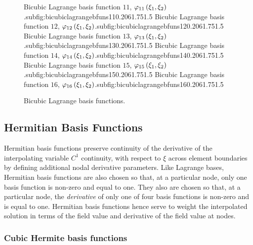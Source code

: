 \begin{figure}[hbtp]
     {Bicubic Lagrange basis function $11$, $   \varphi_{11} \left( \xi_{1},\xi_{2} \right)  $.}{subfig:bicubiclagrangebfuns11}{0.20\linewidth}{6}{1.75}{1.5}
   \hfil
     {Bicubic Lagrange basis function $12$, $   \varphi_{12} \left( \xi_{1},\xi_{2} \right)  $.}{subfig:bicubiclagrangebfuns12}{0.20\linewidth}{6}{1.75}{1.5}
     {Bicubic Lagrange basis function $13$, $   \varphi_{13} \left( \xi_{1},\xi_{2} \right)  $.}{subfig:bicubiclagrangebfuns13}{0.20\linewidth}{6}{1.75}{1.5}
   \hfil
     {Bicubic Lagrange basis function $14$, $   \varphi_{14} \left( \xi_{1},\xi_{2} \right)  $.}{subfig:bicubiclagrangebfuns14}{0.20\linewidth}{6}{1.75}{1.5}
   \hfil
     {Bicubic Lagrange basis function $15$, $   \varphi_{15} \left( \xi_{1},\xi_{2} \right)  $.}{subfig:bicubiclagrangebfuns15}{0.20\linewidth}{6}{1.75}{1.5}
   \hfil
     {Bicubic Lagrange basis function $16$, $   \varphi_{16} \left( \xi_{1},\xi_{2} \right)  $.}{subfig:bicubiclagrangebfuns16}{0.20\linewidth}{6}{1.75}{1.5}
   \caption[Bicubic Lagrange basis functions.]{Bicubic Lagrange basis functions.}
   \label{fig:bicubiclagrangebfuns}
\end{figure}

\subsection{Hermitian Basis Functions}
\label{sec:Hermitianbasisfunctions}

Hermitian basis functions preserve continuity of the derivative of the
interpolating variable \ie $C^{1}$ continuity, with respect to $\xi$ across
element boundaries by defining additional nodal derivative parameters. Like
Lagrange bases, Hermitian basis functions are also chosen so that, at a
particular node, only one basis function is non-zero and equal to one. They
also are chosen so that, at a particular node, the \emph{derivative} of only
one of four basis functions is non-zero and is equal to one. Hermitian basis
functions hence serve to weight the interpolated solution in terms of the
field value and derivative of the field value at nodes.

\subsubsection{Cubic Hermite basis functions}

